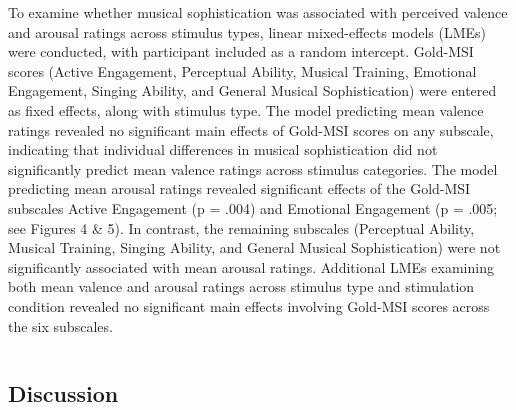 \documentclass[
]{article}
\begin{document}
To examine whether musical sophistication was associated with perceived
valence and arousal ratings across stimulus types, linear mixed-effects
models (LMEs) were conducted, with participant included as a random
intercept. Gold-MSI scores (Active Engagement, Perceptual Ability,
Musical Training, Emotional Engagement, Singing Ability, and General
Musical Sophistication) were entered as fixed effects, along with
stimulus type. The model predicting mean valence ratings revealed no
significant main effects of Gold-MSI scores on any subscale, indicating
that individual differences in musical sophistication did not
significantly predict mean valence ratings across stimulus categories.
The model predicting mean arousal ratings revealed significant effects
of the Gold-MSI subscales Active Engagement (p = .004) and Emotional
Engagement (p = .005; see Figures 4 \& 5). In contrast, the remaining
subscales (Perceptual Ability, Musical Training, Singing Ability, and
General Musical Sophistication) were not significantly associated with
mean arousal ratings. Additional LMEs examining both mean valence and
arousal ratings across stimulus type and stimulation condition revealed
no significant main effects involving Gold-MSI scores across the six
subscales.

\begin{verbatim}
\end{verbatim}

\subsection{Discussion}\label{discussion}
\end{document}

